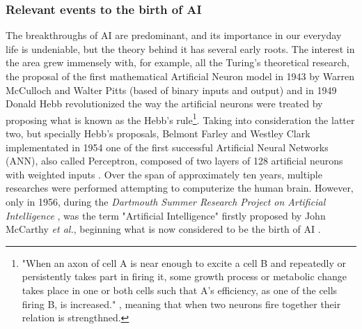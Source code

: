 \documentclass[a4paper, 12pt]{report}
\begin{document}

\subsubsection{Relevant events to the birth of AI}
\par The breakthroughs of AI are predominant, and its importance in our everyday life is undeniable, but the theory behind it has several early roots. The interest in the area grew immensely with, for example, all the Turing's theoretical research, the proposal of the first mathematical Artificial Neuron model in 1943 by Warren McCulloch and Walter Pitts (based of binary inputs and output) \autocite{mccullochLOGICALCALCULUSIDEAS} and in 1949 Donald Hebb revolutionized the way the artificial neurons were treated by proposing what is known as the Hebb's rule\footnote{"When an axon of cell A is near enough to excite a cell B and repeatedly or persistently takes part in firing it, some growth process or metabolic change takes place in one or both cells such that A’s efficiency, as one of the cells firing B, is increased." \autocite{hebbOrganizationBehaviorNeuropsychological1949}, meaning that when two neurons fire together their relation is strengthned.}. Taking into consideration the latter two, but specially Hebb's proposals, Belmont Farley and Westley Clark implementated in 1954 one of the first successful Artificial Neural Networks (ANN), also called Perceptron, composed of two layers of 128 artificial neurons with weighted inputs \autocite{farleySimulationSelforganizingSystems1954}. Over the span of approximately ten years, multiple researches were performed attempting to computerize the human brain. However, only in 1956, during the \textit{Dartmouth Summer Research Project on Artificial Intelligence} \autocite{mccarthyPROPOSALDARTMOUTHSUMMER}, was the term "Artificial Intelligence" firstly proposed by John McCarthy \textit{et al.}, beginning what is now considered to be the birth of AI \autocite{zhangStudyArtificialIntelligence2021}.  
\end{document}
